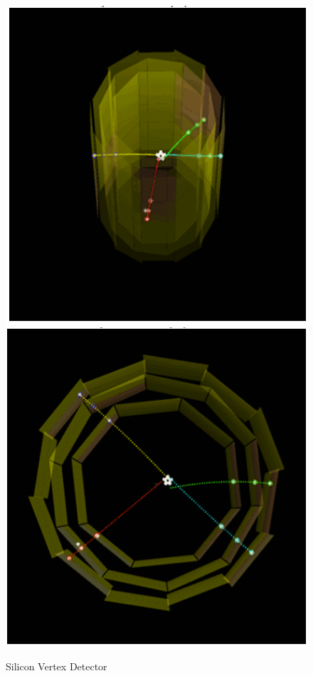 \documentclass{article}
\begin{document}
\begin{figure}[h]

\includegraphics[scale=0.4]{detector}
\includegraphics[scale=0.4]{detector-2}
\caption{Silicon Vertex Detector}
\end{figure}
\end{document}
